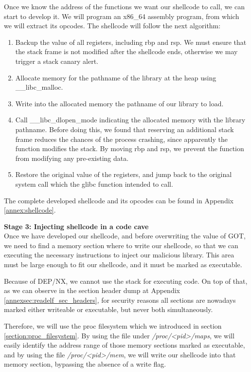 Once we know the address of the functions we want our shellcode to call, we can start to develop it. We will program an x86\_64 assembly program, from which we will extract its opcodes. The shellcode will follow the next algorithm:
\begin{enumerate}
\item Backup the value of all registers, including rbp and rsp. We must ensure that the stack frame is not modified after the shellcode ends, otherwise we may trigger a stack canary alert.
\item Allocate memory for the pathname of the library at the heap using \_\_libc\_malloc.
\item Write into the allocated memory the pathname of our library to load.
\item Call \_\_libc\_dlopen\_mode indicating the allocated memory with the library pathname. Before doing this, we found that reserving an additional stack frame reduces the chances of the process crashing, since apparently the function modifies the stack. By moving rbp and rsp, we prevent the function from modifying any pre-existing data.
\item Restore the original value of the registers, and jump back to the original system call which the glibc function intended to call.
\end{enumerate}

The complete developed shellcode and its opcodes can be found in Appendix \ref{annex:shellcode}.


\textbf{Stage 3: Injecting shellcode in a code cave}\\
Once we have developed our shellcode, and before overwriting the value of GOT, we need to find a memory section where to write our shellcode, so that we can executing the necessary instructions to inject our malicious library. This area must be large enough to fit our shellcode, and it must be marked as executable. 

Because of DEP/NX, we cannot use the stack for executing code. On top of that, as we can observe in the section header dump at Appendix \ref{annexsec:readelf_sec_headers}, for security reasons all sections are nowadays marked either writeable or executable, but never both simultaneously.

Therefore, we will use the proc filesystem which we introduced in section \ref{section:proc_filesystem}. By using the file under \textit{/proc/<pid>/maps}, we will easily identify the address range of those memory sections marked as executable, and by using the file \textit{/proc/<pid>/mem}, we will write our shellcode into that memory section, bypassing the absence of a write flag.


